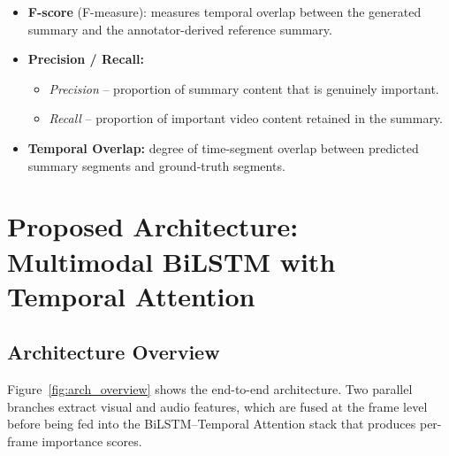 \documentclass[12pt, a4paper]{report}
\begin{document}
\begin{itemize}[leftmargin=1.5cm]
  \item \textbf{F-score} (F-measure): measures temporal overlap between the generated
        summary and the annotator-derived reference summary.
  \item \textbf{Precision / Recall:}
        \begin{itemize}
          \item \emph{Precision} -- proportion of summary content that is genuinely important.
          \item \emph{Recall} -- proportion of important video content retained in the summary.
        \end{itemize}
  \item \textbf{Temporal Overlap:} degree of time-segment overlap between predicted
        summary segments and ground-truth segments.
\end{itemize}

\chapter{Proposed Architecture: Multimodal BiLSTM with Temporal Attention}

\section{Architecture Overview}

Figure~\ref{fig:arch_overview} shows the end-to-end architecture. Two parallel
branches extract visual and audio features, which are fused at the frame level before
being fed into the BiLSTM--Temporal Attention stack that produces per-frame
importance scores.
\end{document}
